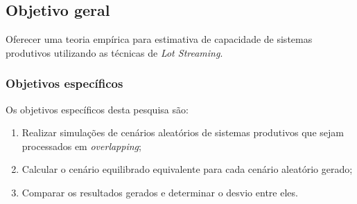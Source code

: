 \subsection{Objetivo geral} \label{subsec:objetivos}
    Oferecer uma teoria empírica para estimativa de capacidade de sistemas produtivos utilizando as técnicas de \textit{Lot Streaming}.
    
    \subsubsection{Objetivos específicos} \label{subsubsec:obespec}
    Os objetivos específicos desta pesquisa são:
        \begin{enumerate}[label=\alph*)]
            \item Realizar simulações de cenários aleatórios de sistemas produtivos que sejam processados em \textit{overlapping};
            \item Calcular o cenário equilibrado equivalente para cada cenário aleatório gerado;
            \item Comparar os resultados gerados e determinar o desvio entre eles.
        \end{enumerate}
